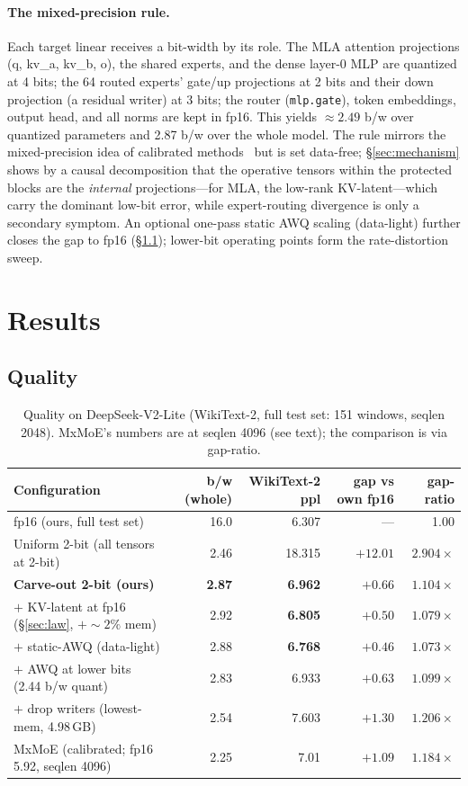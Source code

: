 \documentclass[10pt]{article}
\begin{document}
\paragraph{The mixed-precision rule.}
Each target linear receives a bit-width by its role. The MLA attention projections (q, kv\_a, kv\_b, o),
the shared experts, and the dense layer-0 MLP are quantized at 4 bits; the 64 routed experts' gate/up
projections at 2 bits and their down projection (a residual writer) at 3 bits; the router
(\texttt{mlp.gate}), token embeddings, output head, and all norms are kept in fp16. This yields
$\approx 2.49$ b/w over quantized parameters and 2.87 b/w over the whole model. The rule mirrors the
mixed-precision idea of calibrated methods~\cite{mcmoe,eaquant,mxmoe} but is set data-free;
\S\ref{sec:mechanism} shows by a causal decomposition that the operative tensors within the protected
blocks are the \emph{internal} projections---for MLA, the low-rank KV-latent---which carry the dominant
low-bit error, while expert-routing divergence is only a secondary symptom. An optional one-pass static
AWQ scaling (data-light) further closes the gap to fp16 (\S\ref{sec:quality}); lower-bit operating
points form the rate-distortion sweep.

\section{Results}\label{sec:results}
\subsection{Quality}\label{sec:quality}
\begin{table}[h]\centering\small
\begin{tabular}{lrrrr}
\toprule
Configuration & b/w (whole) & WikiText-2 ppl & gap vs own fp16 & gap-ratio \\
\midrule
fp16 (ours, full test set) & 16.0 & 6.307 & --- & 1.00 \\
Uniform 2-bit (all tensors at 2-bit) & 2.46 & 18.315 & $+12.01$ & $2.904\times$ \\
\textbf{Carve-out 2-bit (ours)} & \textbf{2.87} & \textbf{6.962} & \textbf{$+0.66$} & \textbf{$1.104\times$} \\
\;\;$+$ KV-latent at fp16 (\S\ref{sec:law}, ${+}{\sim}2\%$ mem) & 2.92 & \textbf{6.805} & $+0.50$ & \textbf{$1.079\times$} \\
\;\;$+$ static-AWQ (data-light) & 2.88 & \textbf{6.768} & $+0.46$ & \textbf{$1.073\times$} \\
\;\;$+$ AWQ at lower bits (2.44 b/w quant) & 2.83 & 6.933 & $+0.63$ & $1.099\times$ \\
\;\;$+$ drop writers (lowest-mem, 4.98\,GB) & 2.54 & 7.603 & $+1.30$ & $1.206\times$ \\
MxMoE (calibrated; fp16 5.92, seqlen 4096)~\cite{mxmoe} & 2.25 & 7.01 & $+1.09$ & $1.184\times$ \\
\bottomrule
\end{tabular}
\caption{Quality on DeepSeek-V2-Lite (WikiText-2, full test set: 151 windows, seqlen 2048). MxMoE's
numbers are at seqlen 4096 (see text); the comparison is via gap-ratio.}
\label{tab:quality}
\end{table}
\end{document}
